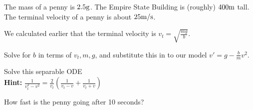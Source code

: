 \begin{applicationActivities}
\begin{observation}
The mass of a penny is \(2.5 {\rm g}\).  The Empire State Building is (roughly) \(400 {\rm m}\) tall.
\vfill
The terminal velocity of a penny is about \(25 {\rm m/s}\).
\end{observation}

\begin{activity}{20}
We calculated earlier that the terminal velocity is \(v_t = \sqrt{\frac{mg}{b}}\).  
\begin{subactivity}
Solve for \(b\) in terms of \(v_t,m,g\), and substitute this in to our model \(v'=g-\frac{b}{m}v^2\).
\end{subactivity}
\begin{subactivity}
Solve this separable ODE \\
\textbf{Hint:} \(\frac{1}{v_t^2-v^2}=\frac{2}{v_t}\left(\frac{1}{v_t-v}+\frac{1}{v_t+v}\right)\)
\end{subactivity}
\begin{subactivity}
How fast is the penny going after 10 seconds?
\end{subactivity}
\end{activity}



\end{applicationActivities}
